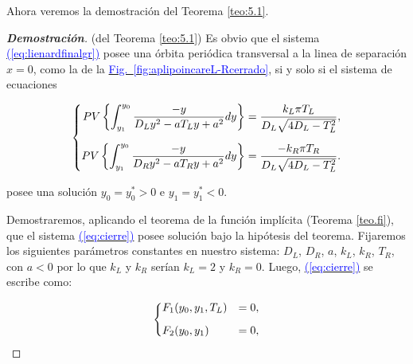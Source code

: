 \documentclass[12pt,a4paper]{report} %
\newcommand{\fref}[1]{\hyperref[#1]{\textcolor{blue}{Fig.~\ref*{#1}}}}
\newcommand{\eref}[1]{\hyperref[#1]{\textcolor{blue}{(\ref*{#1})}}}
\begin{document}
	\vspace{0.5cm}\noindent Ahora veremos la demostración del Teorema \ref{teo:5.1}.
	\begin{proof}[\textbf{Demostración}](del Teorema \ref{teo:5.1})
		\label{dem5.1}
	Es obvio que el sistema \eref{eq:lienardfinalgr} posee una órbita periódica transversal a la linea de separación $x=0$, como la de la \fref{fig:aplipoincareL-Rcerrado}, si y solo si el sistema de ecuaciones
	
	\begin{equation}
		\label{eq:cierre}
		\scalebox{1}{$\displaystyle
			\left\{
			\begin{aligned}
				PV\left\{\int_{y_1}^{y_0}\frac{-y}{D_Ly^2-aT_Ly+a^2}dy\right\}&=\frac{k_L\pi T_L}{D_L\sqrt{4D_L-T_L^2}},
				\\[2mm]
				PV\left\{\int_{y_1}^{y_0}\frac{-y}{D_Ry^2-aT_Ry+a^2}dy\right\}&=\frac{-k_R\pi T_R}{D_L\sqrt{4D_L-T_L^2}}.
			\end{aligned}
			\right. 
			$}
	\end{equation}\smallskip
	
	\vspace{0.5cm}\noindent posee una solución $y_0=y_0^*>0$ e $y_1=y_1^*<0$.
	
	\vspace{0.5cm}\noindent Demostraremos, aplicando el teorema de la función implícita (Teorema \ref{teo.fi}), que el sistema \eref{eq:cierre} posee solución bajo la hipótesis del teorema. Fijaremos los siguientes parámetros constantes en nuestro sistema: $D_L$, $D_R$, $a$, $k_L$, $k_R$, $T_R$, con $a<0$ por lo que $k_L$ y $k_R$ serían $k_L=2$ y $k_R=0$. Luego, \eref{eq:cierre} se escribe como:
	

	
	\begin{equation}
		\label{eq:cierre3}
		\scalebox{1}{$\displaystyle
			\left\{
			\begin{aligned}
				&F_1(y_0,y_1,T_L)&=0,
				\\[2mm]
				&F_2(y_0,y_1)&=0,
			\end{aligned}
			\right. 
			$}
	\end{equation}\smallskip
	

\end{proof}
\end{document}
